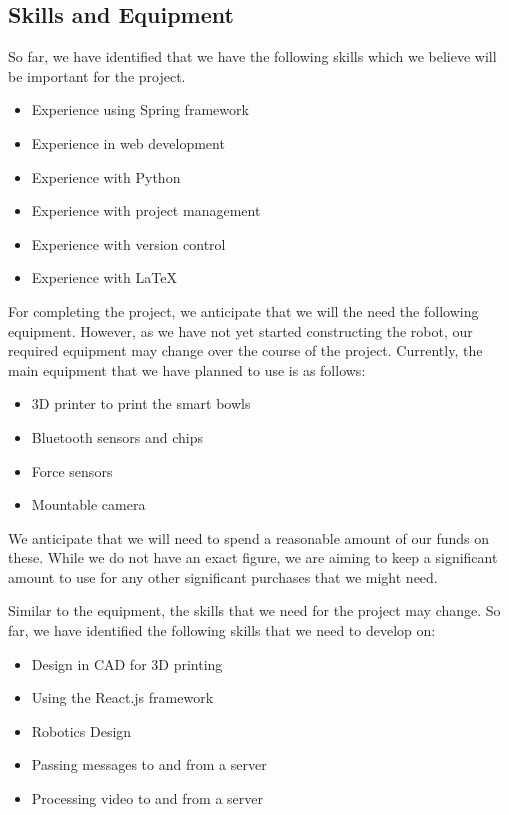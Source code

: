     \subsection{Skills and Equipment}
    So far, we have identified that we have the following skills which we believe will be important for the project.
    \begin{itemize}
        \setlength{\itemindent}{.2in}
        \item Experience using Spring framework
        \item Experience in web development
        \item Experience with Python
        \item Experience with project management
        \item Experience with version control
        \item Experience with \LaTeX
    \end{itemize}
    For completing the project, we anticipate that we will the need the following equipment. However, as we have not yet started constructing the robot, our required equipment may change over the course of the project. Currently, the main equipment that we have planned to use is as follows:
    \begin{itemize}
        \setlength{\itemindent}{.2in}
        \item 3D printer to print the smart bowls
        \item Bluetooth sensors and chips
        \item Force sensors
        \item Mountable camera
    
    \end{itemize}
We anticipate that we will need to spend a reasonable amount of our funds on these. While we do not have an exact figure, we are aiming to keep a significant amount to use for any other significant purchases that we might need. \par

Similar to the equipment, the skills that we need for the project may change. So far, we have identified the following skills that we need to develop on:
    \begin{itemize}
        \setlength{\itemindent}{.2in}
        \item Design in CAD for 3D printing
        \item Using the React.js framework
        \item Robotics Design
        \item Passing messages to and from a server
        \item Processing video to and from a server
    \end{itemize}

